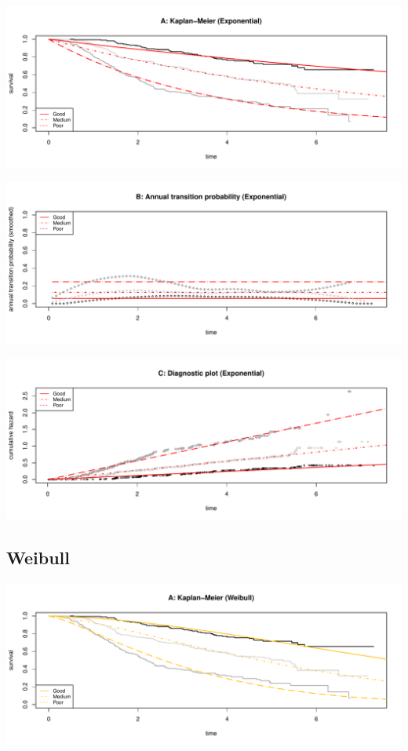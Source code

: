 \documentclass[]{article}
\begin{document}
\begin{flushleft}\includegraphics[height=0.3\textheight]{images/expo-1} \end{flushleft}

\begin{flushleft}\includegraphics[height=0.3\textheight]{images/expo-2} \end{flushleft}

\begin{flushleft}\includegraphics[height=0.3\textheight]{images/expo-3} \end{flushleft}

\subsection{Weibull}\label{weibull}

\begin{flushleft}\includegraphics[height=0.3\textheight]{images/weib-1} \end{flushleft}
\end{document}
